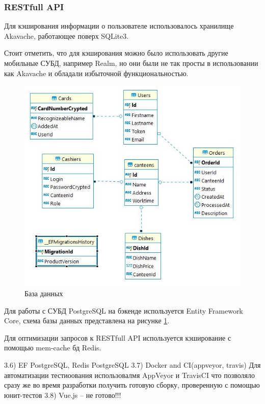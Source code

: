 \documentclass[14pt]{matmex-diploma-custom}
\begin{document}
            \subsubsection{RESTfull API}
                Для кэширования информации о пользователе использовалось хранилище Akavache\cite{akavache_github}, работающее поверх SQLite3.
                
                Стоит отметить, что для кэширования можно было использовать другие мобильные СУБД,
                например Realm, но они были не так просты в использовании как Akavache и обладали избыточной функциональностью.

    \begin{figure}
        \centering
        \includegraphics[scale=0.8]{database_arch1.jpg}
        \caption{База данных}
        \label{db_arch}
    \end{figure}
    Для работы с СУБД PostgreSQL на бэкенде используется Entity Framework Core,
    схема базы данных представлена на рисунке \ref{db_arch}.

    Для оптимизации запросов к RESTfull API используется кэширование с помощью mem-cache бд Redis\cite{redis_dotnet_doc}.

    3.6) EF PostgreSQL, Redis
    PostgreSQL
    3.7) Docker and CI(appveyor, travis)
        Для автоматизации тестиоования использовалмя AppVeyor и TravisCI что позволяло сразу же во время разработки получить готовую сборку, проверенную с помощью юнит-тестов
    3.8) Vue.js -- не готово!!!
    
\end{document}
